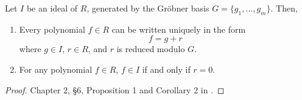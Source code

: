 \begin{comment}
\begin{theorem}
  \label{thm_groebner_basis_product}
  Let $I$ and $J$ be ideals of $R = K[x_1, \ldots, x_n]$, generated by Gr\"obner bases, say
  \begin{align*}
    I &= \pid{f_1, \ldots, f_m} \\
    J &= \pid{g_1, \ldots, g_n}.
  \end{align*}
  Then
  \[ \{ f_ig_j ~|~ 1 \leq i \leq m, 1 \leq j \leq n \} \]
  is a Gr\"obner basis for the ideal product $IJ$.
\end{theorem}
\begin{proof}
  \begin{align*}
    \LT(IJ)
      &= \pid{ \LT(h) ~|~ h \in IJ } \\
      &= \pid{ \LT(fg) ~|~ f \in I, g \in J } \\
      &= \pid{ \LT(f)\LT(g) ~|~ f \in I, g \in J } \\
      &= \pid{ \LT(f) ~|~ f \in I } \pid{ \LT(g) ~|~ g \in J } \\
      &= \LT(I) \LT(J) \\
      &= \pid{ \LT(f_i) ~|~ 1 \leq i \leq m } \pid{ \LT(g_j) ~|~ 1 \leq j \leq n } \\
      &= \pid{ \LT(f_i) \LT(g_j) ~|~ 1 \leq i \leq m, 1 \leq j \leq n } \\
      &= \pid{ \LT(f_i g_j) ~|~ 1 \leq i \leq m, 1 \leq j \leq n }
  \end{align*}
\end{proof}
\end{comment}

\begin{theorem}
  \label{thm_groebner_basis_remainder}
  Let $I$ be an ideal of $R$, generated by the Gr\"obner basis $G = \{ g_1, \ldots, g_m \}$. Then,
  \begin{enumerate}[label=(\roman*)]
    \item
    Every polynomial $f \in R$ can be written uniquely in the form
    \begin{equation*}
      f = g + r
    \end{equation*}
    where $g \in I$, $r \in R$, and $r$ is reduced modulo $G$.

    \item
    For any polynomial $f \in R$, $f \in I$ if and only if $r = 0$.
  \end{enumerate}
\end{theorem}
\begin{proof}
  Chapter 2, \S 6, Proposition 1 and Corollary 2 in \cite{cox07}.
\end{proof}

